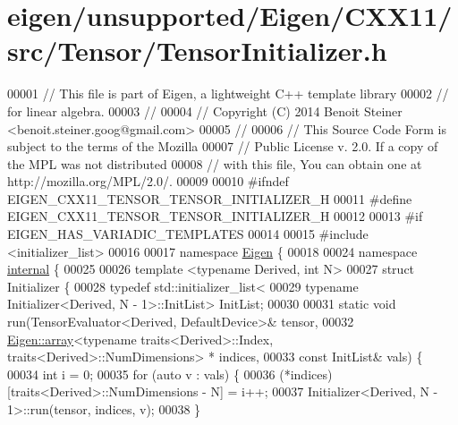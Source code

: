 \hypertarget{eigen_2unsupported_2_eigen_2_c_x_x11_2src_2_tensor_2_tensor_initializer_8h_source}{}\section{eigen/unsupported/\+Eigen/\+C\+X\+X11/src/\+Tensor/\+Tensor\+Initializer.h}
\label{eigen_2unsupported_2_eigen_2_c_x_x11_2src_2_tensor_2_tensor_initializer_8h_source}

\begin{DoxyCode}
00001 \textcolor{comment}{// This file is part of Eigen, a lightweight C++ template library}
00002 \textcolor{comment}{// for linear algebra.}
00003 \textcolor{comment}{//}
00004 \textcolor{comment}{// Copyright (C) 2014 Benoit Steiner <benoit.steiner.goog@gmail.com>}
00005 \textcolor{comment}{//}
00006 \textcolor{comment}{// This Source Code Form is subject to the terms of the Mozilla}
00007 \textcolor{comment}{// Public License v. 2.0. If a copy of the MPL was not distributed}
00008 \textcolor{comment}{// with this file, You can obtain one at http://mozilla.org/MPL/2.0/.}
00009 
00010 \textcolor{preprocessor}{#ifndef EIGEN\_CXX11\_TENSOR\_TENSOR\_INITIALIZER\_H}
00011 \textcolor{preprocessor}{#define EIGEN\_CXX11\_TENSOR\_TENSOR\_INITIALIZER\_H}
00012 
00013 \textcolor{preprocessor}{#if EIGEN\_HAS\_VARIADIC\_TEMPLATES}
00014 
00015 \textcolor{preprocessor}{#include <initializer\_list>}
00016 
00017 \textcolor{keyword}{namespace }\hyperlink{namespace_eigen}{Eigen} \{
00018 
00024 \textcolor{keyword}{namespace }\hyperlink{namespaceinternal}{internal} \{
00025 
00026 \textcolor{keyword}{template} <\textcolor{keyword}{typename} Derived, \textcolor{keywordtype}{int} N>
00027 \textcolor{keyword}{struct }Initializer \{
00028   \textcolor{keyword}{typedef} std::initializer\_list<
00029     \textcolor{keyword}{typename} Initializer<Derived, N - 1>::InitList> InitList;
00030 
00031   \textcolor{keyword}{static} \textcolor{keywordtype}{void} run(TensorEvaluator<Derived, DefaultDevice>& tensor,
00032                   \hyperlink{class_eigen_1_1array}{Eigen::array}<\textcolor{keyword}{typename} traits<Derived>::Index, traits<Derived>::NumDimensions>
      * indices,
00033                   \textcolor{keyword}{const} InitList& vals) \{
00034     \textcolor{keywordtype}{int} i = 0;
00035     \textcolor{keywordflow}{for} (\textcolor{keyword}{auto} v : vals) \{
00036       (*indices)[traits<Derived>::NumDimensions - N] = i++;
00037       Initializer<Derived, N - 1>::run(tensor, indices, v);
00038     \}

\end{DoxyCode}

